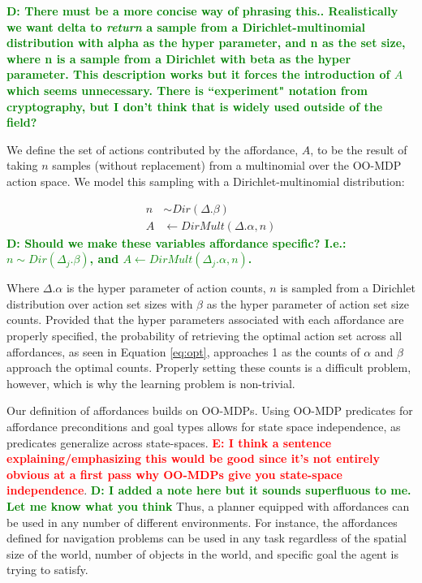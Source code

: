 \documentclass[conference]{IEEEtran}
\newcommand{\dnote}[1]{\textcolor{Green}{\textbf{D: #1}}}
\newcommand{\enote}[1]{\textcolor{Red}{\textbf{E: #1}}}
\begin{document}
\dnote{There must be a more concise way of phrasing this.. Realistically we want delta to {\it return} a sample from a Dirichlet-multinomial distribution with alpha as the hyper parameter, and n as the set size, where n is a sample from a Dirichlet with beta as the hyper parameter. This description works but it forces the introduction of $A$ which seems unnecessary. There is ``experiment" notation from cryptography, but I don't think that is widely used outside of the field?}

We define the set of actions contributed by the affordance, $A$, to be the result
of taking $n$ samples (without replacement) from a multinomial over the OO-MDP
action space. We model this sampling with a Dirichlet-multinomial distribution:

\begin{equation} 
\begin{split}
n &\sim Dir(\Delta.\beta) \\
A &\leftarrow DirMult(\Delta.\alpha, n)
\end{split}
\label{eq:dir_mult_sample}
\end{equation}
\dnote{Should we make these variables affordance specific? I.e.: $n \sim Dir(\Delta_j.\beta)$, and $A \leftarrow DirMult(\Delta_j.\alpha,n)$.}

Where $\Delta.\alpha$ is the hyper parameter of action counts, $n$ is sampled 
from a Dirichlet distribution over action set sizes with $\beta$ as the hyper parameter
of action set size counts. Provided that the hyper parameters associated with each 
affordance are properly specified, the probability of retrieving the optimal action set 
across all affordances, as seen in Equation \ref{eq:opt}, approaches 1 as the counts 
of $\alpha$ and $\beta$ approach the optimal counts. Properly setting these counts 
is a difficult problem, however, which is why the learning problem is non-trivial.

Our definition of affordances builds on OO-MDPs. Using OO-MDP predicates for affordance
preconditions and goal types allows for state space independence, as predicates generalize across state-spaces. 
\enote{I think a sentence explaining/emphasizing this would be good since it's not entirely obvious at a first pass why OO-MDPs give you state-space independence}. \dnote{I added a note here but it sounds superfluous to me. Let me know what you think} 
Thus, a planner equipped with affordances can be used in any number of
different environments. For instance, the affordances defined for navigation problems 
can be used in any task regardless of the spatial size of the world, number of objects in 
the world, and specific goal the agent is trying to satisfy.
\end{document}
